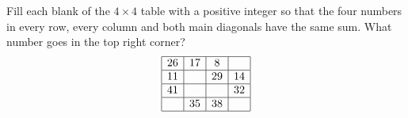 Fill each blank of the $4\times4$ table with a positive integer so that the four numbers in every row, every column and both main diagonals have the same sum. What number goes in the top right corner?
\[\begin{array}{|c|c|c|c|}\hline 26&17&8&\ \\\hline 11&&29&14\\\hline 41&&&32\\\hline &35&38&\\\hline\end{array}\]
